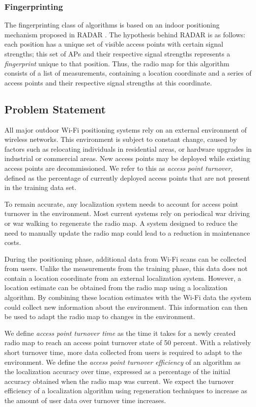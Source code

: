 \documentclass{sig-alternate-br}
\begin{document}
\subsubsection{Fingerprinting}
The fingerprinting class of algorithms is based on an indoor positioning mechanism proposed in RADAR \cite{bahl:radar}. The hypothesis behind RADAR is as follows: each position has a unique set of visible access points with certain signal strengths; this set of APs and their respective signal strengths represents a \textit{fingerprint} unique to that position. Thus, the radio map for this algorithm consists of a list of measurements, containing a location coordinate and a series of access points and their respective signal strengths at this coordinate. 

\subsection{Problem Statement}
All major outdoor Wi-Fi positioning systems rely on an external environment of wireless networks. This environment is subject to constant change, caused by factors such as relocating individuals in residential areas, or hardware upgrades in industrial or commercial areas. New access points may be deployed while existing access points are decommissioned. We refer to this as \textit{access point turnover}, defined as the percentage of currently deployed access points that are not present in the training data set.

To remain accurate, any localization system needs to account for access point turnover in the environment. Most current systems rely on periodical war driving or war walking to regenerate the radio map. A system designed to reduce the need to manually update the radio map could lead to a reduction in maintenance costs.

During the positioning phase, additional data from Wi-Fi scans can be collected from users. Unlike the measurements from the training phase, this data does not contain a location coordinate from an external localization system. However, a location estimate can be obtained from the radio map using a localization algorithm. By combining these location estimates with the Wi-Fi data the system could collect new information about the environment. This information can then be used to adapt the radio map to changes in the environment. 

We define \textit{access point turnover time} as the time it takes for a newly created radio map to reach an access point turnover state of 50 percent. With a relatively short turnover time, more data collected from users is required to adapt to the environment. We define the \textit{access point turnover efficiency} of an algorithm as the localization accuracy over time, expressed as a percentage of the initial accuracy obtained when the radio map was current. We expect the turnover efficiency of a localization algorithm using regeneration techniques to increase as the amount of user data over turnover time increases.
\end{document}
